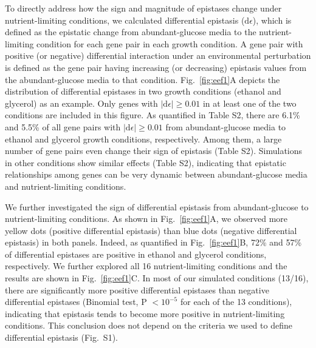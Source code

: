 \documentclass[10pt]{article}
\def\D{\mathrm{d}}
\newcommand{\Fig}{Fig.}
\begin{document}
To directly address how the sign and magnitude of epistases change
under nutrient-limiting conditions, we calculated differential
epistasis ($\D\epsilon$), which is defined as the epistatic change from
abundant-glucose media to the nutrient-limiting condition for each
gene pair in each growth condition. A gene pair with positive (or
negative) differential interaction under an environmental perturbation
is defined as the gene pair having increasing (or decreasing)
epistasis values from the abundant-glucose media to that
condition. \Fig~\ref{fig:eef1}A depicts the
distribution of differential
epistases in two growth conditions (ethanol and glycerol) as an
example. Only genes with $\left|\D\epsilon\right| \geq 0.01$ in at least
one of the two conditions are included in this figure. As quantified
in Table S2, there are 6.1\% and 5.5\% of all gene pairs with
$\left|\D\epsilon\right| \geq 0.01$ from abundant-glucose media to ethanol
and glycerol growth conditions, respectively. Among them, a large
number of gene pairs even change their sign of epistasis (Table
S2). Simulations in other conditions show similar effects (Table S2),
indicating that epistatic relationships among genes can be very
dynamic between abundant-glucose media and nutrient-limiting
conditions.



We further investigated the sign of differential epistasis from
abundant-glucose to nutrient-limiting conditions. As shown in \Fig~\ref{fig:eef1}A, 
we observed more yellow dots (positive differential epistasis)
than blue dots (negative differential epistasis) in both
panels. Indeed, as quantified in \Fig~\ref{fig:eef1}B, 72\% and 57\% of
differential epistases are positive in ethanol and glycerol
conditions, respectively. We further explored all 16 nutrient-limiting
conditions and the results are shown in \Fig~\ref{fig:eef1}C. In most of our
simulated conditions (13/16), there are significantly more positive
differential epistases than negative differential epistases (Binomial
test, P $< 10^{-5}$ for each of the 13 conditions), indicating that
epistasis tends to become more positive in nutrient-limiting
conditions. This conclusion does not depend on the criteria we used to
define differential epistasis (\Fig~S1).
\end{document}

